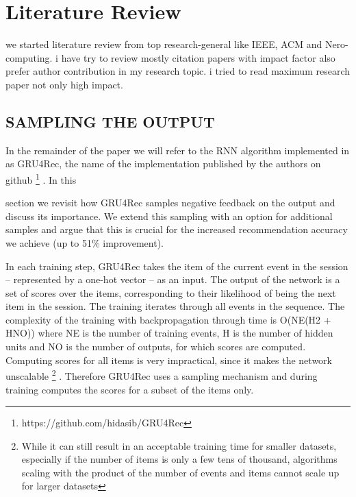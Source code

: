 \chapter{Literature Review}
we started literature review from top research-general like IEEE, ACM and Nero-computing. i have try to review mostly citation papers with impact factor also prefer author contribution in my research topic. i tried to read maximum research paper not only high impact.  


\section{SAMPLING THE OUTPUT}
\label{sec:sample}

In the remainder of the paper we will refer to the RNN algorithm implemented in \cite{hidasi2015session} as GRU4Rec, the name of the implementation published by the authors on github \footnote{https://github.com/hidasib/GRU4Rec}
. In this

section we revisit how GRU4Rec samples negative feedback on the output and discuss its importance. We extend this sampling with an option for additional samples and argue that this is crucial
for the increased recommendation accuracy we achieve (up to 51\% improvement).


In each training step, GRU4Rec takes the item of the current event in the session – represented
by a one-hot vector – as an input. The output of the network is a set of scores over the items,
corresponding to their likelihood of being the next item in the session. The training iterates through
all events in the sequence. The complexity of the training with backpropagation through time is
O(NE(H2 + HNO)) where NE is the number of training events, H is the number of hidden units
and NO is the number of outputs, for which scores are computed. Computing scores for all items
is very impractical, since it makes the network unscalable \footnote[2]{While it can still result in an acceptable training time for smaller datasets, especially if the number of items
is only a few tens of thousand, algorithms scaling with the product of the number of events and items cannot
scale up for larger datasets}
. Therefore GRU4Rec uses a sampling
mechanism and during training computes the scores for a subset of the items only.

